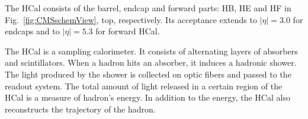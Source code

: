 The HCal consists of the barrel, endcap and forward parts: HB, HE and HF in Fig.~\ref{fig:CMSschemView}, top, respectively. Its acceptance extends to $|\eta|=3.0$ for endcaps and to $|\eta|=5.3$ for forward HCal.

The HCal is a sampling calorimeter. It consists of alternating layers of absorbers and scintillators. When a hadron hits an absorber, it induces a hadronic shower. The light produced by the shower is collected on optic fibers and passed to the readout system. The total amount of light released in a certain region of the HCal is a measure of hadron's energy. In addition to the energy, the HCal also reconstructs the trajectory of the hadron.   





